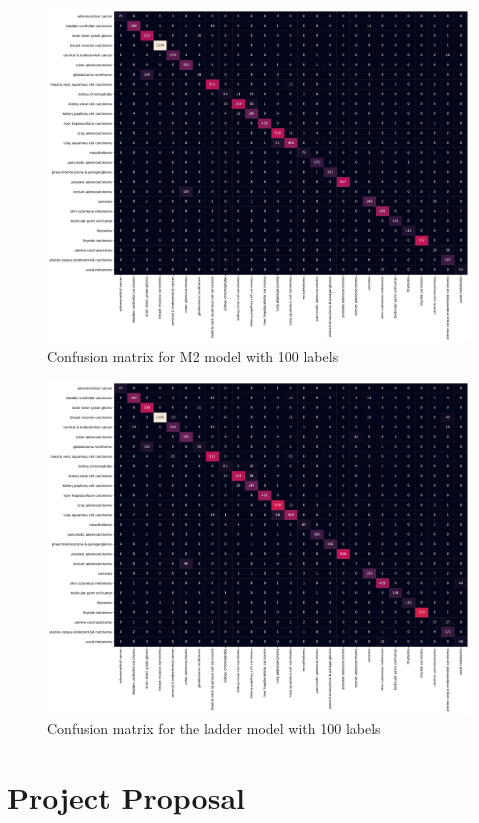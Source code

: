 \begin{figure}[H]
  \centering
  \includegraphics[scale=0.5, angle=90]{figs/m2_tcga_minmax_m2_100.pdf}
  \caption{Confusion matrix for M2 model with 100 labels}
\end{figure}

\begin{figure}[H]
  \centering
  \includegraphics[scale=0.5, angle=90]{figs/ladder_tcga_standard_100.pdf}
  \caption{Confusion matrix for the ladder model with 100 labels}
\end{figure}

\chapter{Project Proposal} \label{proposal}
